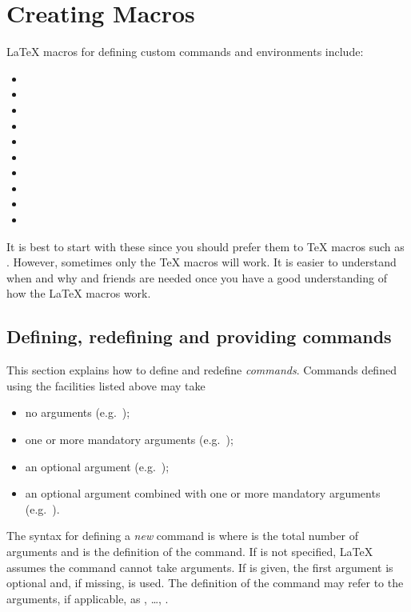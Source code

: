 \appendix\label{app}

\section<1-| beamer:0>{Creating Macros}\label{sec:macros}

\LaTeX{} macros for defining custom commands and environments include:
\begin{itemize}
  \item {}
  \item {}
  \item {}
  \item {}
  \item {}
  \item {}
  \item {}
  \item {}
  \item {}
  \item {}
\end{itemize}
It is best to start with these since you should prefer them to \TeX{} macros such as .
However, sometimes only the \TeX{} macros will work.
It is easier to understand when and why  and friends are needed once you have a good understanding of how the \LaTeX{} macros work.

\subsection{Defining, redefining and providing commands}\label{subsec:commands}

This section explains how to define and redefine \emph{commands}.
Commands defined using the \LaTeXe{} facilities listed above may take
\begin{itemize}
  \item no arguments (e.g.~);
  \item one or more mandatory arguments (e.g.~);
  \item an optional argument (e.g.~);
  \item an optional argument combined with one or more mandatory arguments (e.g.~).
\end{itemize}
The syntax for defining a \emph{new} command is
where  is the total number of arguments and  is the definition of the command.
If  is not specified, \LaTeX{} assumes the command cannot take arguments.
If  is given, the first argument is optional and, if missing,  is used.
The definition of the command may refer to the arguments, if applicable, as \narg, \dots, \narg[9].

